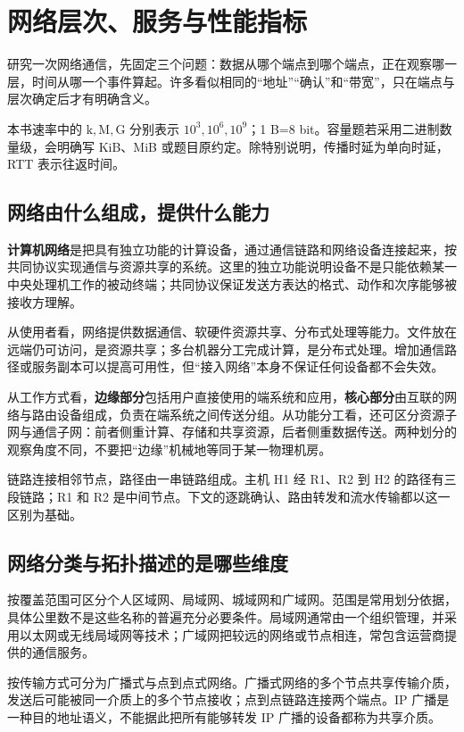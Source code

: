 \chapter{网络层次、服务与性能指标}\label{cn-ch1}

研究一次网络通信，先固定三个问题：数据从哪个端点到哪个端点，正在观察哪一层，时间从哪一个事件算起。许多看似相同的``地址''``确认''和``带宽''，只在端点与层次确定后才有明确含义。

本书速率中的 \(\mathrm{k},\mathrm{M},\mathrm{G}\) 分别表示 \(10^3,10^6,10^9\)；1 B=8 bit。容量题若采用二进制数量级，会明确写 KiB、MiB 或题目原约定。除特别说明，传播时延为单向时延，RTT 表示往返时间。

\section{网络由什么组成，提供什么能力}\label{cn-01-01}

\textbf{计算机网络}是把具有独立功能的计算设备，通过通信链路和网络设备连接起来，按共同协议实现通信与资源共享的系统。这里的独立功能说明设备不是只能依赖某一中央处理机工作的被动终端；共同协议保证发送方表达的格式、动作和次序能够被接收方理解。

从使用者看，网络提供数据通信、软硬件资源共享、分布式处理等能力。文件放在远端仍可访问，是资源共享；多台机器分工完成计算，是分布式处理。增加通信路径或服务副本可以提高可用性，但``接入网络''本身不保证任何设备都不会失效。

从工作方式看，\textbf{边缘部分}包括用户直接使用的端系统和应用，\textbf{核心部分}由互联的网络与路由设备组成，负责在端系统之间传送分组。从功能分工看，还可区分资源子网与通信子网：前者侧重计算、存储和共享资源，后者侧重数据传送。两种划分的观察角度不同，不要把``边缘''机械地等同于某一物理机房。

链路连接相邻节点，路径由一串链路组成。主机 H1 经 R1、R2 到 H2 的路径有三段链路；R1 和 R2 是中间节点。下文的逐跳确认、路由转发和流水传输都以这一区别为基础。

\section{网络分类与拓扑描述的是哪些维度}\label{cn-01-02}

按覆盖范围可区分个人区域网、局域网、城域网和广域网。范围是常用划分依据，具体公里数不是这些名称的普遍充分必要条件。局域网通常由一个组织管理，并采用以太网或无线局域网等技术；广域网把较远的网络或节点相连，常包含运营商提供的通信服务。

按传输方式可分为广播式与点到点式网络。广播式网络的多个节点共享传输介质，发送后可能被同一介质上的多个节点接收；点到点链路连接两个端点。IP 广播是一种目的地址语义，不能据此把所有能够转发 IP 广播的设备都称为共享介质。


